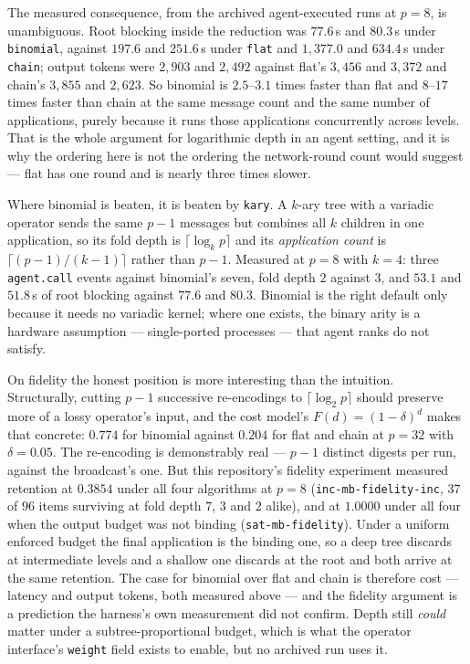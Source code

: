 \documentclass[11pt]{article}
\begin{document}
The measured consequence, from the archived agent-executed runs at $p=8$, is unambiguous. Root
blocking inside the reduction was $77.6$\,s and $80.3$\,s under \texttt{binomial}, against
$197.6$ and $251.6$\,s under \texttt{flat} and $1{,}377.0$ and $634.4$\,s under \texttt{chain};
output tokens were $2{,}903$ and $2{,}492$ against flat's $3{,}456$ and $3{,}372$ and chain's
$3{,}855$ and $2{,}623$. So binomial is $2.5$--$3.1$ times faster than flat and $8$--$17$ times
faster than chain at the same message count and the same number of applications, purely because
it runs those applications concurrently across levels. That is the whole argument for
logarithmic depth in an agent setting, and it is why the ordering here is not the ordering the
network-round count would suggest --- flat has one round and is nearly three times slower.

Where binomial is beaten, it is beaten by \texttt{kary}. A $k$-ary tree with a variadic operator
sends the same $p-1$ messages but combines all $k$ children in one application, so its fold
depth is $\lceil\log_k p\rceil$ and its \emph{application count} is
$\lceil (p-1)/(k-1) \rceil$ rather than $p-1$. Measured at $p=8$ with $k=4$: three
\texttt{agent.call} events against binomial's seven, fold depth $2$ against $3$, and $53.1$ and
$51.8$\,s of root blocking against $77.6$ and $80.3$. Binomial is the right default only
because it needs no variadic kernel; where one exists, the binary arity is a hardware
assumption --- single-ported processes --- that agent ranks do not satisfy.

On fidelity the honest position is more interesting than the intuition. Structurally, cutting
$p-1$ successive re-encodings to $\lceil\log_2 p\rceil$ should preserve more of a lossy
operator's input, and the cost model's $F(d) = (1-\delta)^d$ makes that concrete: $0.774$ for
binomial against $0.204$ for flat and chain at $p=32$ with $\delta = 0.05$. The re-encoding is
demonstrably real --- $p-1$ distinct digests per run, against the broadcast's one. But this
repository's fidelity experiment measured retention at $0.3854$ under all four algorithms at
$p=8$ (\texttt{inc-mb-fidelity-inc}, $37$ of $96$ items surviving at fold depth $7$, $3$ and $2$
alike), and at $1.0000$ under all four when the output budget was not binding
(\texttt{sat-mb-fidelity}). Under a uniform enforced budget the final application is the
binding one, so a deep tree discards at intermediate levels and a shallow one discards at the
root and both arrive at the same retention. The case for binomial over flat and chain is
therefore cost --- latency and output tokens, both measured above --- and the fidelity argument
is a prediction the harness's own measurement did not confirm. Depth still \emph{could} matter
under a subtree-proportional budget, which is what the operator interface's \texttt{weight}
field exists to enable, but no archived run uses it.
\end{document}
